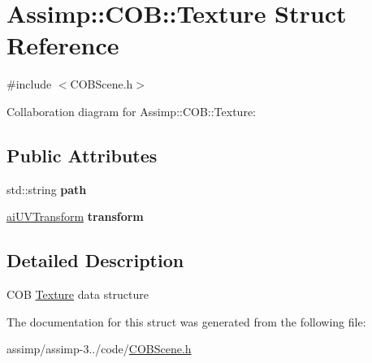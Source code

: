 \hypertarget{struct_assimp_1_1_c_o_b_1_1_texture}{\section{Assimp\+:\+:C\+O\+B\+:\+:Texture Struct Reference}
\label{struct_assimp_1_1_c_o_b_1_1_texture}
}


{\ttfamily \#include $<$C\+O\+B\+Scene.\+h$>$}



Collaboration diagram for Assimp\+:\+:C\+O\+B\+:\+:Texture\+:
\subsection*{Public Attributes}
\begin{DoxyCompactItemize}
\item 
\hypertarget{struct_assimp_1_1_c_o_b_1_1_texture_ac9584087c12db7767dd091d712db49ce}{std\+::string {\bfseries path}}\label{struct_assimp_1_1_c_o_b_1_1_texture_ac9584087c12db7767dd091d712db49ce}

\item 
\hypertarget{struct_assimp_1_1_c_o_b_1_1_texture_ab94bccb3498c1b82e468a254c148f1e5}{\hyperlink{structai_u_v_transform}{ai\+U\+V\+Transform} {\bfseries transform}}\label{struct_assimp_1_1_c_o_b_1_1_texture_ab94bccb3498c1b82e468a254c148f1e5}

\end{DoxyCompactItemize}


\subsection{Detailed Description}
C\+O\+B \hyperlink{struct_assimp_1_1_c_o_b_1_1_texture}{Texture} data structure 

The documentation for this struct was generated from the following file\+:\begin{DoxyCompactItemize}
\item 
assimp/assimp-\/3../code/\hyperlink{_c_o_b_scene_8h}{C\+O\+B\+Scene.\+h}\end{DoxyCompactItemize}
